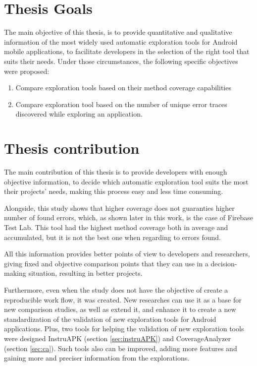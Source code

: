 \section{Thesis  Goals}\label{sec:thesisGoals}

The main objective of this thesis, is to provide quantitative and qualitative information of the most widely used automatic exploration tools for Android mobile applications, to facilitate developers in the selection of the right tool that suits their needs. Under those circumstances, the following specific objectives were proposed:
		\begin{enumerate}
			\item Compare exploration tools  based on their method  coverage capabilities
			\item Compare exploration tool based on the number of unique error traces discovered while exploring an application.
		\end{enumerate}

\section{Thesis contribution} \label{sec:thesisContribution}

The main contribution of this thesis is to provide developers with enough objective information, to decide which automatic exploration tool suits the most their projects' needs, making this process easy and less time consuming.

Alongside, this study shows that higher coverage does not guaranties higher number of found errors, which, as shown later in this work, is the case of Firebase Test Lab. This tool had the highest method coverage both in average and accumulated, but it is not the best one when regarding to errors found. 

All this information provides better points of view to developers and researchers, giving fixed and objective comparison points that they can use in a decision-making situation, resulting in better projects. 

Furthermore, even when the study does not have the objective of create a reproducible work flow, it was created. New researches can use it as a base for new comparison studies, as well as extend it, and enhance it to create a new standardization of the validation of new exploration tools for Android applications. Plus, two tools for helping the validation of new exploration tools were designed InstruAPK (section \ref{sec:instruAPK}) and CoverageAnalyzer (section \ref{sec:ca}). Such tools also can be improved, adding more features and gaining more and preciser information from the explorations.
	
